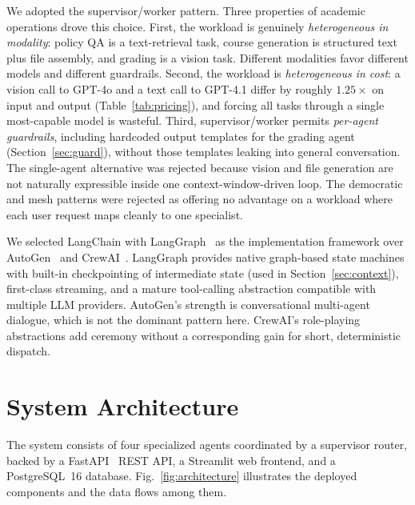 \documentclass[conference]{IEEEtran}
\begin{document}
We adopted the supervisor/worker pattern. Three properties of academic operations drove this choice. First, the workload is genuinely \emph{heterogeneous in modality}: policy QA is a text-retrieval task, course generation is structured text plus file assembly, and grading is a vision task. Different modalities favor different models and different guardrails. Second, the workload is \emph{heterogeneous in cost}: a vision call to GPT-4o and a text call to GPT-4.1 differ by roughly $1.25\times$ on input and output (Table~\ref{tab:pricing}), and forcing all tasks through a single most-capable model is wasteful. Third, supervisor/worker permits \emph{per-agent guardrails}, including hardcoded output templates for the grading agent (Section~\ref{sec:guard}), without those templates leaking into general conversation. The single-agent alternative was rejected because vision and file generation are not naturally expressible inside one context-window-driven loop. The democratic and mesh patterns were rejected as offering no advantage on a workload where each user request maps cleanly to one specialist.

We selected LangChain with LangGraph~\cite{langchain2024,langgraph2024} as the implementation framework over AutoGen~\cite{wu2023autogen} and CrewAI~\cite{crewai2024}. LangGraph provides native graph-based state machines with built-in checkpointing of intermediate state (used in Section~\ref{sec:context}), first-class streaming, and a mature tool-calling abstraction compatible with multiple LLM providers. AutoGen's strength is conversational multi-agent dialogue, which is not the dominant pattern here. CrewAI's role-playing abstractions add ceremony without a corresponding gain for short, deterministic dispatch.

\section{System Architecture}

The system consists of four specialized agents coordinated by a supervisor router, backed by a FastAPI~\cite{fastapi2024} REST API, a Streamlit web frontend, and a PostgreSQL~16 database. Fig.~\ref{fig:architecture} illustrates the deployed components and the data flows among them.
\end{document}

